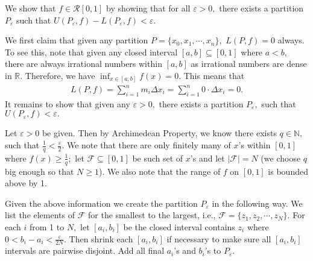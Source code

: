 \documentclass[12pt]{article}
\begin{document}
\begin{fproof}[5]
  We show that \(f \in \mathcal{R}[0,1]\) by showing that for all \(\varepsilon > 0,\) there exists a partition \(P_{\varepsilon}\) such that \(U(P_{\varepsilon},f) - L(P_{\varepsilon},f) < \varepsilon\).

  We first claim that given any partition \(P = \{x_0, x_1, \cdots, x_n\},\) \(L(P,f) = 0\) always.
  To see this, note that given any closed interval \([a,b] \subseteq [0,1]\) where \(a < b,\) there are always irrational numbers within \([a,b]\) as irrational numbers are dense in \(\mathbb{R}\).
  Therefore, we have \(\inf_{x \in [a,b]} f(x) = 0.\)
  This means that
  \begin{align*}
    L(P,f) = \sum_{i = 1}^{n} m_i \Delta x_i = \sum_{i=1}^{n} 0 \cdot \Delta x_i = 0.
  \end{align*}
  It remains to show that given any \(\varepsilon > 0,\) there exists a partition \(P_{\varepsilon},\) such that \(U(P_{\varepsilon}, f) < \varepsilon.\)
  
  Let \(\varepsilon > 0\) be given. Then by Archimedean Property, we know there exists \(q \in \mathbb{N},\) such that \(\frac{1}{q} < \frac{\varepsilon}{2}.\)
  We note that there are only finitely many of \(x\)'s within \([0,1]\) where \(f(x) \geq \frac{1}{q};\) let \(\mathcal{F} \subseteq [0,1]\) be such set of \(x\)'s and let \(|\mathcal{F}| = N\) (we choose \(q\) big enough so that \(N \geq 1\)).
  We also note that the range of \(f\) on \([0,1]\) is bounded above by 1.

  Given the above information we create the partition \(P_{\varepsilon}\) in the following way.
  We list the elements of \(\mathcal{F}\) for the smallest to the largest, i.e., \(\mathcal{F} = \{z_1, z_2, \cdots, z_N\}.\)
  For each \(i\) from 1 to \(N,\) let \([a_i,b_i]\) be the closed interval contains \(z_i\) where \(0 < b_i-a_i < \frac{\varepsilon}{2N}.\) Then shrink each \([a_i, b_i]\) if necessary to make sure all \([a_i, b_i]\) intervals are pairwise disjoint. Add all final \(a_i\)'s and \(b_i\)'s to \(P_{\varepsilon}.\) 


\end{fproof}
\end{document}
